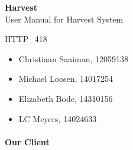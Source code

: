 \documentclass[11pt,fleqn]{book} %
\begin{document}

\begingroup
\thispagestyle{empty}
\centering
\vspace{5cm}
\par\normalfont\fontsize{35}{35}\sffamily\selectfont
\textbf{Harvest}\\
{\LARGE User Manual for Harvest System}\par %
\vspace{0.5cm}
{\Huge HTTP\_418}\par
\centering
\vspace{0.5cm}
\begin{itemize}[label={}, noitemsep]	
		\Large
		\item \begin{center} Christiaan Saaiman, 12059138 \end{center}
		\item \begin{center} Michael Loosen, 14017254 \end{center}
		\item \begin{center} Elizabeth Bode, 14310156 \end{center}
		\item \begin{center} LC Meyers, 14024633 \end{center}	
\end{itemize}
\vspace{1cm}
\paragraph{Our Client}

\endgroup



\pagestyle{empty} %

\tableofcontents %

\end{document}
